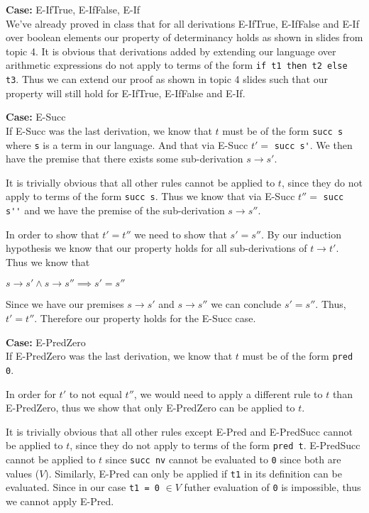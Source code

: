 \documentclass[12pt, fleqn]{article}
\begin{document}
\medskip
\textbf{Case:} E-IfTrue, E-IfFalse, E-If\\
We've already proved in class that for all derivations E-IfTrue, E-IfFalse and E-If over 
boolean elements our property of determinancy holds as shown in slides from topic 4. It is obvious
that derivations added by extending our language over arithmetic expressions do not apply to terms of the form \verb|if t1 then t2 else t3|. 
Thus we can extend our proof as shown in topic 4 slides such that our property will still hold for E-IfTrue, E-IfFalse and E-If.

\medskip
\textbf{Case:} E-Succ\\
If E-Succ was the last derivation, we know that $t$ must be of the form \verb|succ s| where \verb|s| is a term in our language.
And that via E-Succ $t' =$ \verb|succ s'|.
We then have the premise that there exists some sub-derivation $s \rightarrow s'$. 

It is trivially obvious that all other rules cannot be applied to $t$, since they do not apply to terms of the form \verb|succ s|.
Thus we know that via E-Succ $t'' =$ \verb|succ s''| and we have the premise of the sub-derivation $s \rightarrow s''$.

In order to show that $t' = t''$ we need to show that $s' = s''$. By our induction hypothesis we know that our property holds for
all sub-derivations of $t \rightarrow t'$. Thus we know that
\begin{center}
    $s \rightarrow s' \land s \rightarrow s'' \implies s' = s''$
\end{center}
Since we have our premises $s \rightarrow s'$ and $s \rightarrow s''$ we can conclude  $s' = s''$. Thus, $t' = t''$. Therefore our
property holds for the E-Succ case.

\medskip
\textbf{Case:} E-PredZero\\
If E-PredZero was the last derivation, we know that $t$ must be of the form \verb|pred 0|.

In order for $t'$ to not equal $t''$, we would need to apply a different rule to $t$ than E-PredZero, thus
we show that only E-PredZero can be applied to $t$.

\medskip
It is trivially obvious that all other rules except E-Pred and E-PredSucc cannot be applied to $t$, since they do not apply to
terms of the form \verb|pred t|. 
E-PredSucc cannot be applied to $t$ since \verb|succ nv| cannot be evaluated to \verb|0| since both are values ($V$).
Similarly, E-Pred can only be applied if \verb|t1| in its definition can be evaluated. 
Since in our case \verb|t1 = 0| $\in V$ futher evaluation of \verb|0| is impossible, thus we cannot apply E-Pred.
\end{document}
